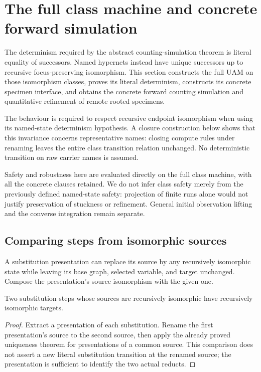 \section{The full class machine and concrete forward simulation}
\label{sec:uam-classes}
The determinism required by the abstract counting-simulation theorem is
literal equality of successors. Named hypernets instead have unique successors
up to recursive focus-preserving isomorphism. This section constructs the full
UAM on those isomorphism classes, proves its literal determinism, constructs
its concrete specimen interface, and obtains the concrete forward counting
simulation and quantitative refinement of remote rooted specimens.

The behaviour is required to respect recursive endpoint isomorphism when
using its named-state determinism hypothesis. A closure construction below
shows that this invariance concerns representative names: closing compute
rules under renaming leaves the entire class transition relation unchanged.
No deterministic transition on raw carrier names is assumed.

Safety and robustness here are evaluated directly on the full class machine,
with all the concrete clauses retained. We do not infer class safety merely
from the previously defined named-state safety: projection of finite runs
alone would not justify preservation of stuckness or refinement. General
initial observation lifting and the converse integration remain separate.

\subsection{Comparing steps from isomorphic sources}
\begin{definition}
A substitution presentation can replace its source by any recursively
isomorphic state while leaving its base graph, selected variable, and target
unchanged. Compose the presentation's source isomorphism with the given one.
\end{definition}
\begin{theorem}
Two substitution steps whose sources are recursively isomorphic have
recursively isomorphic targets.
\end{theorem}
\begin{proof}
Extract a presentation of each substitution. Rename the first presentation's
source to the second source, then apply the already proved uniqueness theorem
for presentations of a common source. This comparison does not assert a
new literal substitution transition at the renamed source; the presentation
is sufficient to identify the two actual reducts.
\end{proof}

